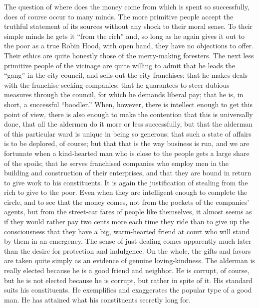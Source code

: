 \documentclass[]{article}
\begin{document}
\begin{sectionbody}
\addamsparagraph The question of where does the money come from which is spent so
successfully, does of course occur to many minds. The more primitive
people accept the truthful statement of its sources without any shock to
their moral sense. To their simple minds he gets it ``from the rich'' and,
so long as he again gives it out to the poor as a true Robin Hood, with
open hand, they have no objections to offer. Their ethics are quite
honestly those of the merry-making foresters. The next less primitive
people of the vicinage are quite willing to admit that he leads the
``gang'' in the city council, and sells out the city franchises; that he
makes deals with the franchise-seeking companies; that he guarantees to
steer dubious measures through the council, for which he demands liberal
pay; that he is, in short, a successful ``boodler.'' When, however, there
is intellect enough to get this point of view, there is also enough to
make the contention that this is universally done, that all the
aldermen do it more or less successfully, but that the alderman of this
particular ward is unique in being so generous; that such a state of
affairs is to be deplored, of course; but that that is the way business
is run, and we are fortunate when a kind-hearted man who is close to the
people gets a large share of the spoils; that he serves franchised
companies who employ men in the building and construction of their
enterprises, and that they are bound in return to give work to his
constituents. It is again the justification of stealing from the rich to
give to the poor. Even when they are intelligent enough to complete the
circle, and to see that the money comes, not from the pockets of the
companies' agents, but from the street-car fares of people like
themselves, it almost seems as if they would rather pay two cents more
each time they ride than to give up the consciousness that they have a
big, warm-hearted friend at court who will stand by them in an
emergency. The sense of just dealing comes apparently much later than
the desire for protection and indulgence. On the whole, the gifts and
favors are taken quite simply as an evidence of genuine loving-kindness.
The alderman is really elected because he is a good friend and neighbor.
He is corrupt, of course, but he is not elected because he is corrupt,
but rather in spite of it. His standard suits his constituents. He
exemplifies and exaggerates the popular type of a good man. He has
attained what his constituents secretly long for.


\end{sectionbody}
\end{document}
